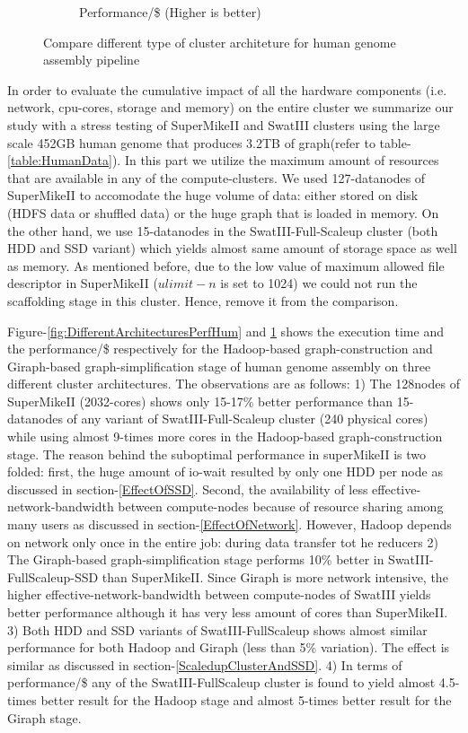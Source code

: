 \documentclass[conference]{IEEEtran}
\begin{document}
\begin{figure}[htb]
\begin{subfigure}[b]{0.23\textwidth}
                \caption{Performance/\$ (Higher is better)}
                \label{fig:DifferentArchitecturesPerfPerDollarHum}
        \end{subfigure}
        \caption{Compare different type of cluster architeture for human genome assembly pipeline}
  \label{fig:DifferentArchitecturesHum}
\end{figure}  

In order to evaluate the cumulative impact of all the hardware components (i.e. network, cpu-cores, storage and memory) on the entire cluster we summarize our study with a stress testing of SuperMikeII and SwatIII clusters using the large scale 452GB human genome that produces 3.2TB of graph(refer to table-\ref{table:HumanData}).
In this part we utilize the maximum amount of resources that are available in any of the compute-clusters. 
We used 127-datanodes of SuperMikeII to accomodate the huge volume of data: either stored on disk (HDFS data or shuffled data) or the huge graph that is loaded in memory. 
On the other hand, we use 15-datanodes in the SwatIII-Full-Scaleup cluster (both HDD and SSD variant) which yields almost same amount of storage space as well as memory.
As mentioned before, due to the low value of maximum allowed file descriptor in SuperMikeII ($ulimit -n$ is set to 1024) we could not run the scaffolding stage in this cluster. Hence, remove it from the comparison.

Figure-\ref{fig:DifferentArchitecturesPerfHum} and \ref{fig:DifferentArchitecturesPerfPerDollarHum} shows the execution time and the performance/\$ respectively for the Hadoop-based graph-construction and Giraph-based graph-simplification stage of human genome assembly on three different cluster architectures.
The observations are as follows:
1) The 128nodes of SuperMikeII (2032-cores) shows only 15-17\% better performance than 15-datanodes of any variant of SwatIII-Full-Scaleup cluster (240 physical cores) while using almost 9-times more cores in the Hadoop-based graph-construction stage.
The reason behind the suboptimal performance in superMikeII is two folded: first, the huge amount of io-wait resulted by only one HDD per node as discussed in section-\ref{EffectOfSSD}. Second, the availability of less effective-network-bandwidth between compute-nodes because of resource sharing among many users as discussed in section-\ref{EffectOfNetwork}. However, Hadoop depends on network only once in the entire job: during data transfer tot he reducers
2) The Giraph-based graph-simplification stage performs 10\% better in SwatIII-FullScaleup-SSD than SuperMikeII. Since Giraph is more network intensive, the higher effective-network-bandwidth between compute-nodes of SwatIII yields better performance although it has very less amount of cores than SuperMikeII.
3) Both HDD and SSD variants of SwatIII-FullScaleup shows almost similar performance for both Hadoop and Giraph (less than 5\% variation). The effect is similar as discussed in section-\ref{ScaledupClusterAndSSD}.
4) In terms of performance/\$ any of the SwatIII-FullScaleup cluster is found to yield almost 4.5-times better result for the Hadoop stage and almost 5-times better result for the Giraph stage.
\end{document}
